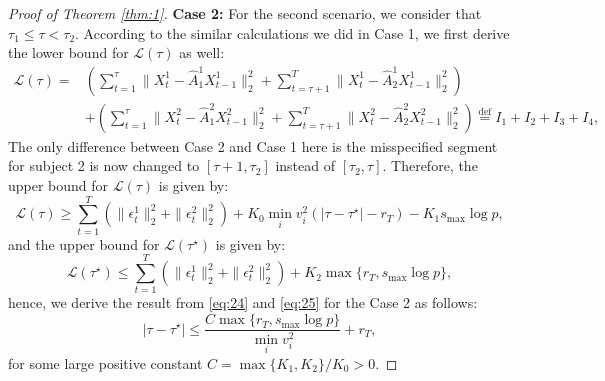 \documentclass[11pt]{article}
\begin{document}
\begin{proof}[Proof of Theorem \ref{thm:1}]
\noindent
{\bf Case 2:}
For the second scenario, we consider that $\tau_1 \leq \tau < \tau_2$. According to the similar calculations we did in Case 1, we first derive the lower bound for $\mathcal{L}(\tau)$ as well:
\begin{equation}
    \label{eq:23}
    \begin{aligned}
        \mathcal{L}(\tau) = &\left(\sum_{t=1}^\tau\|X_t^1 - \widehat{A}_1^1X_{t-1}^1\|_2^2 + \sum_{t=\tau+1}^T\|X_t^1 - \widehat{A}_2^1X_{t-1}^1\|_2^2\right) \\
        &+ \left(\sum_{t=1}^\tau\|X_t^2 - \widehat{A}_1^2X_{t-1}^2\|_2^2 + \sum_{t=\tau+1}^T\|X_t^2 - \widehat{A}_2^2X_{t-1}^2\|_2^2\right) \overset{\text{def}}{=} I_1 + I_2 + I_3 + I_4,
    \end{aligned}
\end{equation}
The only difference between Case 2 and Case 1 here is the misspecified segment for subject 2 is now changed to $[\tau+1, \tau_2]$ instead of $[\tau_2, \tau]$. Therefore, the upper bound for $\mathcal{L}(\tau)$ is given by:
\begin{equation}
    \label{eq:24}
    \mathcal{L}(\tau) \geq \sum_{t=1}^T(\|\epsilon_t^1\|_2^2 + \|\epsilon_t^2\|_2^2) + K_0\min_i v_i^2(|\tau-\tau^\star|-r_T) - K_1s_{\max}\log p,
\end{equation}
and the upper bound for $\mathcal{L}(\tau^\star)$ is given by:
\begin{equation}
    \label{eq:25}
    \mathcal{L}(\tau^\star) \leq \sum_{t=1}^T(\|\epsilon_t^1\|_2^2 + \|\epsilon_t^2\|_2^2) + K_2\max\{r_T, s_{\max}\log p\},
\end{equation}
hence, we derive the result from \eqref{eq:24} and \eqref{eq:25} for the Case 2 as follows:
\begin{equation}
    \label{eq:26}
    |\tau - \tau^\star| \leq \frac{C\max\{r_T, s_{\max}\log p\}}{\min_i v_i^2} + r_T,
\end{equation}
for some large positive constant $C = \max\{K_1, K_2\}/K_0>0$. 


\end{proof}
\end{document}
